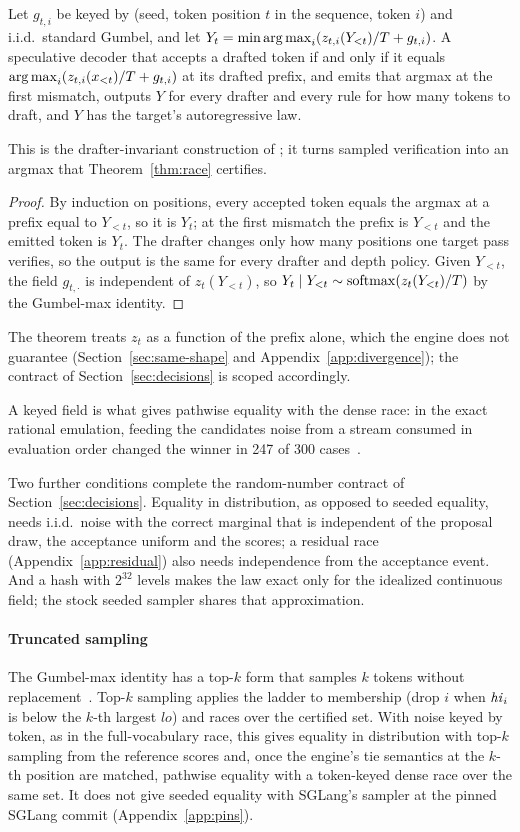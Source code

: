 \begin{theorem}\label{thm:fixednoise}
Let $g_{t,i}$ be keyed by (seed, token position $t$ in the sequence, token $i$) and i.i.d.\ standard Gumbel, and let $Y_t=\min\operatorname*{arg\,max}_i(z_{t,i}(Y_{<t})/T+g_{t,i})$. A speculative decoder that accepts a drafted token if and only if it equals $\operatorname*{arg\,max}_i(z_{t,i}(x_{<t})/T+g_{t,i})$ at its drafted prefix, and emits that argmax at the first mismatch, outputs $Y$ for every drafter and every rule for how many tokens to draft, and $Y$ has the target's autoregressive law.
\end{theorem}
This is the drafter-invariant construction of \citet{daliri2025}; it turns sampled verification into an argmax that Theorem~\ref{thm:race} certifies.
\begin{proof}
By induction on positions, every accepted token equals the argmax at a prefix equal to $Y_{<t}$, so it is $Y_t$; at the first mismatch the prefix is $Y_{<t}$ and the emitted token is $Y_t$. The drafter changes only how many positions one target pass verifies, so the output is the same for every drafter and depth policy. Given $Y_{<t}$, the field $g_{t,\cdot}$ is independent of $z_t(Y_{<t})$, so $Y_t\mid Y_{<t}\sim\operatorname{softmax}(z_t(Y_{<t})/T)$ by the Gumbel-max identity.
\end{proof}
The theorem treats $z_t$ as a function of the prefix alone, which the engine does not guarantee (Section~\ref{sec:same-shape} and Appendix~\ref{app:divergence}); the contract of Section~\ref{sec:decisions} is scoped accordingly.

A keyed field is what gives pathwise equality with the dense race: in the exact rational emulation, feeding the candidates noise from a stream consumed in evaluation order changed the winner in 247 of 300 cases~.

Two further conditions complete the random-number contract of Section~\ref{sec:decisions}. Equality in distribution, as opposed to seeded equality, needs i.i.d.\ noise with the correct marginal that is independent of the proposal draw, the acceptance uniform and the scores; a residual race (Appendix~\ref{app:residual}) also needs independence from the acceptance event. And a hash with $2^{32}$ levels makes the law exact only for the idealized continuous field; the stock seeded sampler shares that approximation.

\paragraph{Truncated sampling}\label{app:truncated} The Gumbel-max identity has a top-$k$ form that samples $k$ tokens without replacement~\cite{kool2019}. Top-$k$ sampling applies the ladder to membership (drop $i$ when $\mathit{hi}_i$ is below the $k$-th largest $lo$) and races over the certified set. With noise keyed by token, as in the full-vocabulary race, this gives equality in distribution with top-$k$ sampling from the reference scores and, once the engine's tie semantics at the $k$-th position are matched, pathwise equality with a token-keyed dense race over the same set. It does not give seeded equality with SGLang's sampler at the pinned SGLang commit (Appendix~\ref{app:pins}).


